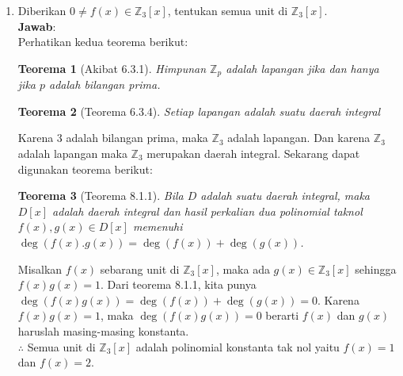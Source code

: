 \documentclass[10pt,openany,a4paper]{article}
\newtheorem*{teorema}{Teorema}
\newcommand{\Z}{\mathbb{Z}}
\newcommand{\jawab}{\textbf{Jawab}:}
\begin{document}
\begin{enumerate}
    \item Diberikan $0\ne f(x)\in\Z_3[x]$, tentukan semua unit di $\Z_3[x]$.\\
    \jawab\\
    Perhatikan kedua teorema berikut:
    \begin{teorema}[Akibat 6.3.1]
        Himpunan $\Z_p$ adalah lapangan jika dan hanya jika $p$ adalah bilangan prima.
    \end{teorema}
    \vspace*{-0.5cm}
    \begin{teorema}[Teorema 6.3.4]
        Setiap lapangan adalah suatu daerah integral
    \end{teorema}
    Karena $3$ adalah bilangan prima, maka $\Z_3$ adalah lapangan. Dan karena $\Z_3$ adalah lapangan maka $\Z_3$ merupakan daerah integral.
    Sekarang dapat digunakan teorema berikut:
    \begin{teorema}[Teorema 8.1.1]
        Bila $D$ adalah suatu daerah integral, maka $D[x]$ adalah daerah integral dan hasil 
        perkalian dua polinomial taknol $f (x), g(x) \in D[x]$ memenuhi $\deg( f (x).g(x)) = \deg( f (x))+ \deg(g(x))$.
    \end{teorema}
    Misalkan $f(x)$ sebarang unit di $\Z_3[x]$, maka ada $g(x)\in\Z_3[x]$ sehingga $f(x)g(x)=1$. Dari 
    teorema 8.1.1, kita punya $\deg(f(x)g(x))=\deg(f(x))+\deg(g(x))=0$. Karena $f(x)g(x)=1$, 
    maka $\deg(f(x)g(x))=0$ berarti $f(x)$ dan $g(x)$ haruslah masing-masing konstanta.\\
    $\therefore$ Semua unit di $\Z_3[x]$ adalah polinomial konstanta tak nol yaitu $f(x)=1$ dan $f(x)=2$.


\end{enumerate}
\end{document}
